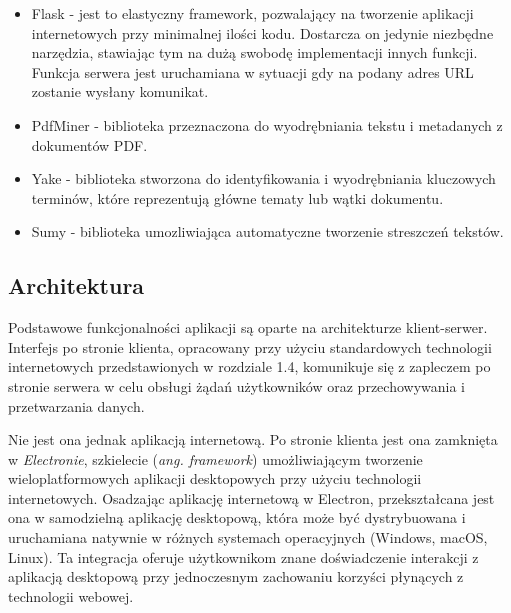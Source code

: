 \documentclass[12pt,a4paper,twoside]{article}
\begin{document}
\begin{itemize}
	\item Flask - jest to elastyczny framework, pozwalający na tworzenie aplikacji internetowych przy minimalnej ilości kodu. Dostarcza on jedynie niezbędne narzędzia, stawiając tym na dużą swobodę implementacji innych funkcji. Funkcja serwera jest uruchamiana w sytuacji gdy na podany adres URL zostanie wysłany komunikat.
	\item PdfMiner - biblioteka przeznaczona do wyodrębniania tekstu i metadanych z dokumentów PDF. 
	\item Yake - biblioteka stworzona do identyfikowania i wyodrębniania kluczowych terminów, które reprezentują główne tematy lub wątki dokumentu.
	\item Sumy - biblioteka umozliwiająca automatyczne tworzenie streszczeń tekstów.
\end{itemize}
\subsection{Architektura}
Podstawowe funkcjonalności aplikacji są oparte na architekturze klient-serwer. Interfejs po stronie klienta, opracowany przy użyciu standardowych technologii internetowych przedstawionych w rozdziale 1.4, komunikuje się z zapleczem po stronie serwera w celu obsługi żądań użytkowników oraz przechowywania i przetwarzania danych.\par
Nie jest ona jednak aplikacją internetową. Po stronie klienta jest ona zamknięta w \textit{Electronie}, szkielecie (\textit{ang. framework}) umożliwiającym tworzenie wieloplatformowych aplikacji desktopowych przy użyciu technologii internetowych. Osadzając aplikację internetową w Electron, przekształcana jest ona w samodzielną aplikację desktopową, która może być dystrybuowana i uruchamiana natywnie w różnych systemach operacyjnych (Windows, macOS, Linux). Ta integracja oferuje użytkownikom znane doświadczenie interakcji z aplikacją desktopową przy jednoczesnym zachowaniu korzyści płynących z technologii webowej.
\end{document}
